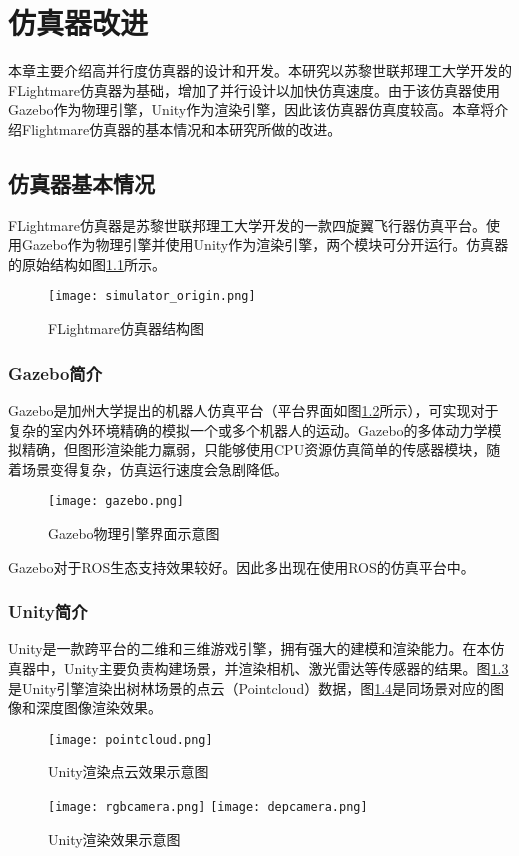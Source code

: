 
\chapter{仿真器改进}
本章主要介绍高并行度仿真器的设计和开发。本研究以苏黎世联邦理工大学开发的FLightmare仿真器为基础，增加了并行设计以加快仿真速度。由于该仿真器使用Gazebo作为物理引擎，Unity作为渲染引擎，因此该仿真器仿真度较高。本章将介绍Flightmare仿真器的基本情况和本研究所做的改进。

\section{仿真器基本情况}
FLightmare仿真器\cite{flightmare}是苏黎世联邦理工大学开发的一款四旋翼飞行器仿真平台。使用Gazebo作为物理引擎并使用Unity作为渲染引擎，两个模块可分开运行。仿真器的原始结构如图\ref{fig_simulator_origin}所示。
\begin{figure}
  \centering
  \texttt{[image: simulator\_origin.png]}
  \caption{FLightmare仿真器结构图}
  \label{fig_simulator_origin}
\end{figure}

\subsection{Gazebo简介}
Gazebo是加州大学提出的机器人仿真平台（平台界面如图\ref{fig_gazebo}所示），可实现对于复杂的室内外环境精确的模拟一个或多个机器人的运动。Gazebo的多体动力学模拟精确，但图形渲染能力羸弱，只能够使用CPU资源仿真简单的传感器模块，随着场景变得复杂，仿真运行速度会急剧降低。
\begin{figure}
  \centering
  \texttt{[image: gazebo.png]}
  \caption{Gazebo物理引擎界面示意图}
  \label{fig_gazebo}
\end{figure}
Gazebo对于ROS生态支持效果较好。因此多出现在使用ROS的仿真平台中。

\subsection{Unity简介}
Unity是一款跨平台的二维和三维游戏引擎\cite{unity}，拥有强大的建模和渲染能力。在本仿真器中，Unity主要负责构建场景，并渲染相机、激光雷达等传感器的结果。图\ref{fig_pointcloud}是Unity引擎渲染出树林场景的点云（Pointcloud）数据，图\ref{fig_camera}是同场景对应的图像和深度图像渲染效果。
\begin{figure}
  \centering
  \texttt{[image: pointcloud.png]}
  \caption{Unity渲染点云效果示意图}
  \label{fig_pointcloud}
\end{figure}
\begin{figure}
  \centering  
    {\texttt{[image: rgbcamera.png]}}
    {\texttt{[image: depcamera.png]}}
  \caption{Unity渲染效果示意图}
  \label{fig_camera}
\end{figure}

